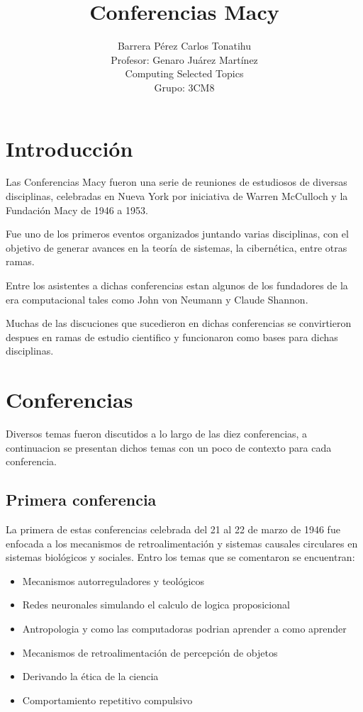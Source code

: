 \documentclass[a4paper, 12pt]{article}
\title{Conferencias Macy}
\author{Barrera Pérez Carlos Tonatihu \\ Profesor: Genaro Juárez Martínez \\ Computing Selected Topics \\ Grupo: 3CM8 }
\begin{document}
\maketitle
\newpage
\section{Introducción}
Las Conferencias Macy fueron una serie de reuniones de estudiosos de diversas disciplinas, celebradas en Nueva York por iniciativa de Warren McCulloch y la Fundación Macy de 1946 a 1953. \cite{WEB}

Fue uno de los primeros eventos organizados juntando varias disciplinas, con el objetivo de generar avances en la teoría de sistemas, la cibernética, entre otras ramas.

Entre los asistentes a dichas conferencias estan algunos de los fundadores de la era computacional tales como John von Neumann y Claude Shannon.

Muchas de las discuciones que sucedieron en dichas conferencias se convirtieron despues en ramas de estudio cientifico y funcionaron como bases para dichas disciplinas. 

\section{Conferencias}
Diversos temas fueron discutidos a lo largo de las diez conferencias, a continuacion se presentan dichos temas con un poco de contexto para cada conferencia.
\subsection{Primera conferencia}
La primera de estas conferencias celebrada del 21 al 22 de marzo de 1946 fue enfocada a los mecanismos de retroalimentación y sistemas causales circulares en sistemas biológicos y sociales. Entro los temas que se comentaron se encuentran:
\begin{itemize}
 \item Mecanismos autorreguladores y teológicos
 \item Redes neuronales simulando el calculo de logica proposicional
 \item Antropologia y como las computadoras podrian aprender a como aprender
 \item Mecanismos de retroalimentación de percepción de objetos
 \item Derivando la ética de la ciencia
 \item Comportamiento repetitivo compulsivo
\end{itemize}
\end{document}
